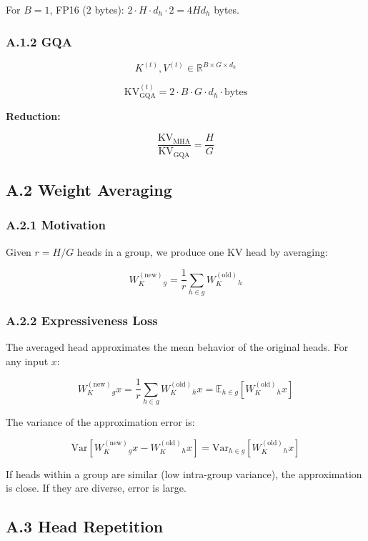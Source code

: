 For $B = 1$, FP16 ($2$ bytes): $2 \cdot H \cdot d_h \cdot 2 = 4 H d_h$ bytes.

\subsubsection{A.1.2 GQA}

\[
K^{(t)}, V^{(t)} \in \mathbb{R}^{B \times G \times d_h}
\tag{A.3}
\]

\[
\text{KV}^{(t)}_\text{GQA} = 2 \cdot B \cdot G \cdot d_h \cdot \text{bytes}
\tag{A.4}
\]

\textbf{Reduction:}

\[
\frac{\text{KV}_\text{MHA}}{\text{KV}_\text{GQA}} = \frac{H}{G}
\tag{A.5}
\]

\subsection{A.2 Weight Averaging}

\subsubsection{A.2.1 Motivation}

Given $r = H / G$ heads in a group, we produce one KV head by averaging:

\[
W_K^{(\text{new})}_g = \frac{1}{r} \sum_{h \in g} W_K^{(\text{old})}_h
\tag{A.6}
\]

\subsubsection{A.2.2 Expressiveness Loss}

The averaged head approximates the mean behavior of the original heads. 
For any input $x$:

\[
W_K^{(\text{new})}_g x = \frac{1}{r} \sum_{h \in g} W_K^{(\text{old})}_h x = \mathbb{E}_{h \in g}[W_K^{(\text{old})}_h x]
\tag{A.7}
\]

The variance of the approximation error is:

\[
\text{Var}[W_K^{(\text{new})}_g x - W_K^{(\text{old})}_h x] = \text{Var}_{h \in g}[W_K^{(\text{old})}_h x]
\tag{A.8}
\]

If heads within a group are similar (low intra-group variance), the 
approximation is close. If they are diverse, error is large.

\subsection{A.3 Head Repetition}

